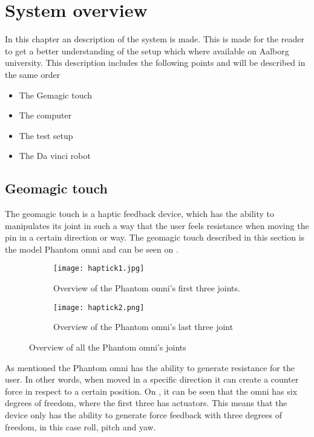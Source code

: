 \chapter{System overview}\label{cha:overview}

In this chapter an description of the system is made. This is made for the reader to get a better understanding of the setup which where available on Aalborg university. This description includes the following points and will be described in the same order

\begin{itemize}
  \item The Gemagic touch
  \item The computer
  \item The test setup
  \item The Da vinci robot
\end{itemize}

\section{Geomagic touch}
The geomagic touch is a haptic feedback device, which has the ability to manipulates its joint in such a way that the user feels resistance when moving the pin in a certain direction or way. The geomagic touch described in this section is the model Phantom omni and can be seen on .

\begin{figure}[H]
	\centering
	\begin{subfigure}{.45\textwidth}
		\centering
		\texttt{[image: haptick1.jpg]}
		\caption{Overview of the Phantom omni's first three joints.}
		\label{fig:phantom1}
	\end{subfigure}
	\begin{subfigure}{.45\textwidth}
		\centering
		\texttt{[image: haptick2.png]}
		\caption{Overview of the Phantom omni's last three joint}
		\label{fig:phantom2}
	\end{subfigure}
\caption{Overview of all the Phantom omni's joints\citep{phantom_omni}}
\label{fig:phantom_omni}
\end{figure}

As mentioned the Phantom omni has the ability to generate resistance for the user. In other words, when moved in a specific direction it can create a counter force in respect to a certain position. On , it can be seen that the omni has six degrees of freedom, where the first three has actuators. This means that the device only has the ability to generate force feedback with three degrees of freedom, in this case roll, pitch and yaw.


